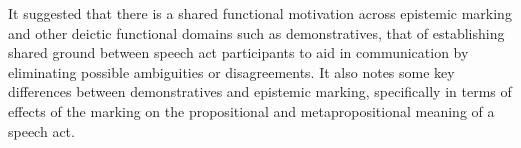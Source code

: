 It suggested that there is a shared functional motivation across epistemic marking and other deictic functional domains such as demonstratives, that of establishing shared ground between speech act participants to aid in communication by eliminating possible ambiguities or disagreements. It also notes some key differences between demonstratives and epistemic marking, specifically in terms of effects of the marking on the propositional and metapropositional meaning of a speech act.